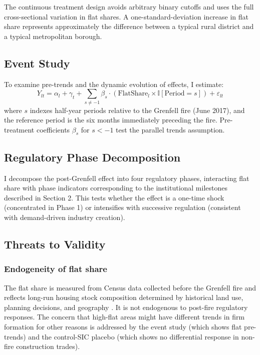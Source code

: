 \documentclass[12pt]{article}
\newcommand{\ind}{\mathbb{I}}
\begin{document}
The continuous treatment design avoids arbitrary binary cutoffs and uses the full cross-sectional variation in flat shares. A one-standard-deviation increase in flat share represents approximately the difference between a typical rural district and a typical metropolitan borough.

\subsection{Event Study}

To examine pre-trends and the dynamic evolution of effects, I estimate:
\begin{equation}
Y_{lt} = \alpha_l + \gamma_t + \sum_{s \neq -1} \beta_s \cdot (\text{FlatShare}_l \times \ind[\text{Period} = s]) + \varepsilon_{lt}
\label{eq:eventstudy}
\end{equation}
where $s$ indexes half-year periods relative to the Grenfell fire (June 2017), and the reference period is the six months immediately preceding the fire. Pre-treatment coefficients $\beta_s$ for $s < -1$ test the parallel trends assumption.

\subsection{Regulatory Phase Decomposition}

I decompose the post-Grenfell effect into four regulatory phases, interacting flat share with phase indicators corresponding to the institutional milestones described in Section 2. This tests whether the effect is a one-time shock (concentrated in Phase 1) or intensifies with successive regulation (consistent with demand-driven industry creation).

\subsection{Threats to Validity}

\subsubsection*{Endogeneity of flat share} The flat share is measured from Census data collected before the Grenfell fire and reflects long-run housing stock composition determined by historical land use, planning decisions, and geography \citep{saiz_2010, glaeser_gyourko_2005}. It is not endogenous to post-fire regulatory responses. The concern that high-flat areas might have different trends in firm formation for other reasons is addressed by the event study (which shows flat pre-trends) and the control-SIC placebo (which shows no differential response in non-fire construction trades).
\end{document}
